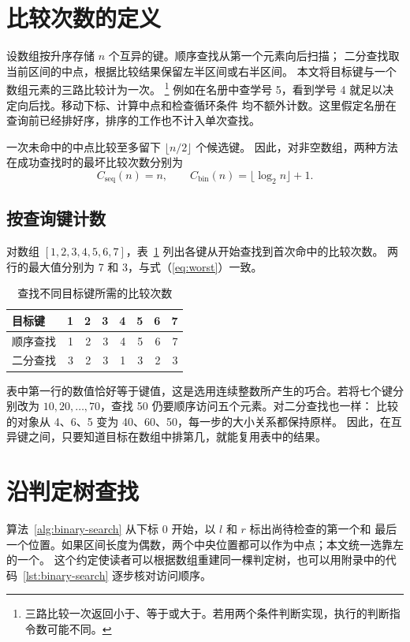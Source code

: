 \documentclass{fduthesis}
\begin{document}
\section{比较次数的定义}
设数组按升序存储 $n$ 个互异的键。顺序查找从第一个元素向后扫描；
二分查找取当前区间的中点，根据比较结果保留左半区间或右半区间\cite{knuth1998}。
本文将目标键与一个数组元素的三路比较计为一次。%
\footnote{三路比较一次返回小于、等于或大于。若用两个条件判断实现，执行的判断指令数可能不同。}
例如在名册中查学号 5，看到学号 4 就足以决定向后找。移动下标、计算中点和检查循环条件
均不额外计数。这里假定名册在查询前已经排好序，排序的工作也不计入单次查找。

一次未命中的中点比较至多留下 $\lfloor n/2\rfloor$ 个候选键。
因此，对非空数组，两种方法在成功查找时的最坏比较次数分别为
\begin{equation}
  C_{\mathrm{seq}}(n)=n,\qquad C_{\mathrm{bin}}(n)=\lfloor\log_2 n\rfloor+1 .
  \label{eq:worst}
\end{equation}

\subsection{按查询键计数}
对数组 $[1,2,3,4,5,6,7]$，表~\ref{tab:counts} 列出各键从开始查找到首次命中的比较次数。
两行的最大值分别为 7 和 3，与式（\ref{eq:worst}）一致。
\begin{table}[htbp]
  \centering
  \caption{查找不同目标键所需的比较次数}
  \label{tab:counts}
  \begin{tabular}{lrrrrrrr}
    \toprule
    目标键 & 1 & 2 & 3 & 4 & 5 & 6 & 7 \\
    \midrule
    顺序查找 & 1 & 2 & 3 & 4 & 5 & 6 & 7 \\
    二分查找 & 3 & 2 & 3 & 1 & 3 & 2 & 3 \\
    \bottomrule
  \end{tabular}
\end{table}

表中第一行的数值恰好等于键值，这是选用连续整数所产生的巧合。若将七个键分别改为
$10,20,\ldots,70$，查找 50 仍要顺序访问五个元素。对二分查找也一样：
比较的对象从 4、6、5 变为 40、60、50，每一步的大小关系都保持原样。
因此，在互异键之间，只要知道目标在数组中排第几，就能复用表中的结果。

\section{沿判定树查找}
算法~\ref{alg:binary-search} 从下标 0 开始，以 $l$ 和 $r$ 标出尚待检查的第一个和
最后一个位置。如果区间长度为偶数，两个中央位置都可以作为中点；本文统一选靠左的一个。
这个约定使读者可以根据数组重建同一棵判定树，也可以用附录中的代码~\ref{lst:binary-search}
逐步核对访问顺序。
\end{document}
